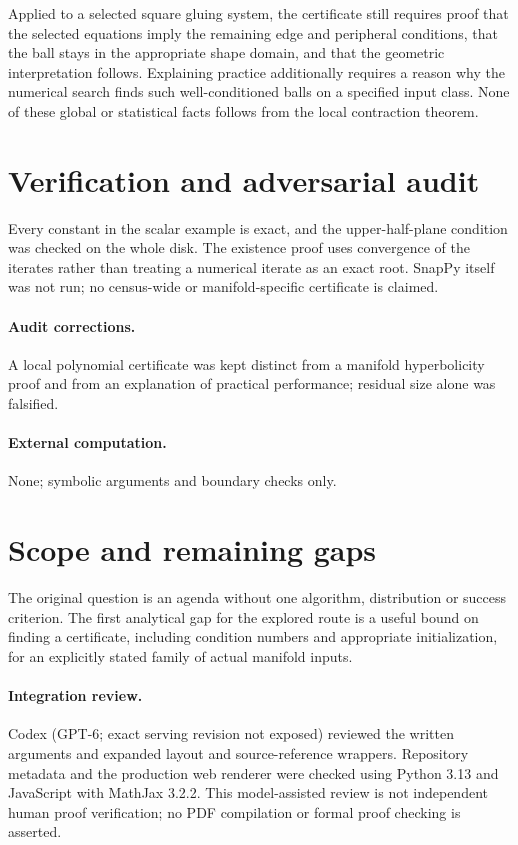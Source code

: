 \documentclass[11pt]{article}
\begin{document}
Applied to a selected square gluing system, the certificate still requires
proof that the selected equations imply the remaining edge and peripheral
conditions, that the ball stays in the appropriate shape domain, and that the
geometric interpretation follows. Explaining practice additionally requires a
reason why the numerical search finds such well-conditioned balls on a specified
input class. None of these global or statistical facts follows from the local
contraction theorem.
\section{Verification and adversarial audit}
Every constant in the scalar example is exact, and the upper-half-plane
condition was checked on the whole disk. The existence proof uses convergence
of the iterates rather than treating a numerical iterate as an exact root.
SnapPy itself was not run; no census-wide or manifold-specific certificate is
claimed.
\paragraph{Audit corrections.} A local polynomial certificate was kept distinct from a manifold hyperbolicity proof and from an explanation of practical performance; residual size alone was falsified.
\paragraph{External computation.} None; symbolic arguments and boundary checks only.
\section{Scope and remaining gaps}
The original question is an agenda without one algorithm, distribution or
success criterion. The first analytical gap for the explored route is a useful
bound on finding a certificate, including condition numbers and appropriate
initialization, for an explicitly stated family of actual manifold inputs.
\paragraph{Integration review.} Codex (GPT-6; exact serving revision not exposed) reviewed the written arguments and expanded layout and source-reference wrappers. Repository metadata and the production web renderer were checked using Python 3.13 and JavaScript with MathJax 3.2.2. This model-assisted review is not independent human proof verification; no PDF compilation or formal proof checking is asserted.
\end{document}
